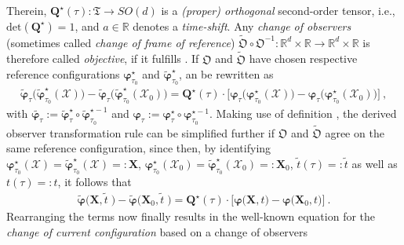 \clearpage
Therein, $\boldsymbol{Q}^{\star}(\tau)\!:\mathfrak{T}\to SO(d)$ is a \emph{(proper) orthogonal} second-order tensor, i.e., $\mathrm{det}(\boldsymbol{Q}^{\star})\!=\!1$, and $a\!\in\!\mathbb{R}$ denotes a \emph{time-shift}. Any \emph{change of observers} (sometimes called \emph{change of frame of reference}) $\tilde{\mathfrak{O}}\circ\mathfrak{O}^{-1}\!:\mathbb{R}^{d}\times\mathbb{R}\to\mathbb{R}^{d}\times\mathbb{R}$ is therefore called \emph{objective}, if it fulfills . If $\mathfrak{O}$ and $\tilde{\mathfrak{O}}$ have chosen respective reference configurations $\boldsymbol{\varphi}^{\star}_{\tau_{0}}$ and $\tilde{\boldsymbol{\varphi}}^{\star}_{\tau_{0}}$,  an be rewritten as
\begin{align}
	\tilde{\boldsymbol{\varphi}}_{\tau}\big(\tilde{\boldsymbol{\varphi}}^{\star}_{\tau_{0}}(\mathcal{X})\big) - \tilde{\boldsymbol{\varphi}}_{\tau}\big(\tilde{\boldsymbol{\varphi}}^{\star}_{\tau_{0}}(\mathcal{X}_{0})\big) = \boldsymbol{Q}^{\star}(\tau)\cdot\big[\boldsymbol{\varphi}_{\tau}\big(\boldsymbol{\varphi}^{\star}_{\tau_{0}}(\mathcal{X})\big) - \boldsymbol{\varphi}_{\tau}\big(\boldsymbol{\varphi}^{\star}_{\tau_{0}}(\mathcal{X}_{0})\big)\big] \ ,
\end{align}
with $\tilde{\boldsymbol{\varphi}_{\tau}}\!:=\!\tilde{\boldsymbol{\varphi}}^{\star}_{\tau}\circ\tilde{\boldsymbol{\varphi}}^{\star-1}_{\tau_{0}}$ and $\boldsymbol{\varphi}_{\tau}\!:=\!\boldsymbol{\varphi}^{\star}_{\tau}\circ\boldsymbol{\varphi}^{\star-1}_{\tau_{0}}$. Making use of definition , the derived observer transformation rule can be simplified further if $\mathfrak{O}$ and $\tilde{\mathfrak{O}}$ agree on the same reference configuration, since then, by identifying $\!\boldsymbol{\varphi}^{\star}_{\tau_{0}}(\mathcal{X})\!=\!\tilde{\boldsymbol{\varphi}}^{\star}_{\tau_{0}}(\mathcal{X})\!=:\!\boldsymbol{X}$, $\!\boldsymbol{\varphi}^{\star}_{\tau_{0}}(\mathcal{X}_{0})\!=\!\tilde{\boldsymbol{\varphi}}^{\star}_{\tau_{0}}(\mathcal{X}_{0})\!=:\!\boldsymbol{X}_{0}$, $\tilde{t}(\tau)\!=:\!\tilde{t}$ as well as $t(\tau)\!=:\!t$, it follows that
\begin{align}
	\tilde{\boldsymbol{\varphi}}\big(\boldsymbol{X},\tilde{t}\;\!\big) - \tilde{\boldsymbol{\varphi}}\big(\boldsymbol{X}_{0},\tilde{t}\;\!\big) = \boldsymbol{Q}^{\star}(\tau)\cdot\big[	\boldsymbol{\varphi}\big(\boldsymbol{X},t\big) - \boldsymbol{\varphi}\big(\boldsymbol{X}_{0},t\big) \big] \ .
\end{align}
Rearranging the terms now finally results in the well-known equation for the \emph{change of current configuration} based on a change of observers

